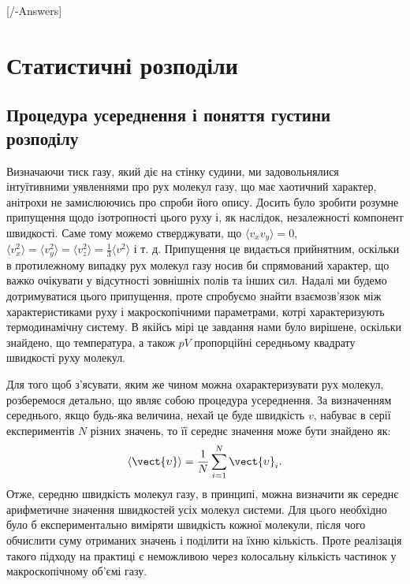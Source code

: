 

[\currfilebase/\currfilebase-Answers]
\chapter{Статистичні розподіли}\label{\currfilebase}
\graphicspath{{\currfilebase/pictures}}
\makeatletter
{}
\makeatother

\section{Процедура усереднення і поняття густини розподілу}

Визначаючи тиск газу, який діє на стінку судини, ми задовольнялися інтуїтивними уявленнями про рух молекул газу, що має хаотичний характер, анітрохи не замислюючись про спроби його опису. Досить було зробити розумне припущення щодо ізотропності цього руху і, як наслідок, незалежності компонент швидкості. Саме тому можемо стверджувати, що $\langle v_x v_y \rangle = 0$, $\langle v_x^2 \rangle = \langle v_y^2 \rangle = \langle v_z^2 \rangle = \frac{1}{3} \langle v^2 \rangle$ і т. д. Припущення це видається прийнятним, оскільки в протилежному випадку рух молекул газу носив би спрямований характер, що важко очікувати у відсутності зовнішніх полів та інших сил. Надалі ми будемо дотримуватися цього припущення, проте спробуємо знайти взаємозв'язок між характеристиками руху і макроскопічними параметрами, котрі характеризують термодинамічну систему. В якійсь мірі це завдання нами було вирішене, оскільки знайдено, що температура, а також $pV$ пропорційні середньому квадрату швидкості руху молекул.

Для того щоб з'ясувати, яким же чином можна охарактеризувати рух молекул, розберемося детально, що являє собою процедура усереднення. За визначенням середнього, якщо будь-яка величина, нехай це буде швидкість $v$, набуває в серії експериментів $N$ різних значень, то її середнє значення може бути знайдено як:
%
\begin{equation}\label{eq:128_1}
    \langle \vect{\upsilon} \rangle = \frac{1}{N} \sum_{i=1}^{N} \vect{\upsilon}_i.
\end{equation}
%
Отже, середню швидкість молекул газу, в принципі, можна визначити як середнє арифметичне значення швидкостей усіх молекул системи. Для цього необхідно було б експериментально виміряти швидкість кожної молекули, після чого обчислити суму отриманих значень і поділити на їхню кількість. Проте реалізація такого підходу на практиці є неможливою через колосальну кількість частинок у макроскопічному об’ємі газу.

